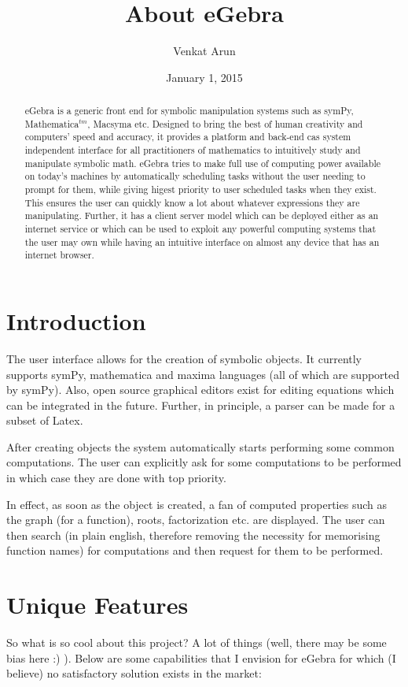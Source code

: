 \documentclass{article}
\title{About eGebra}
\author{Venkat Arun}
\date{January 1, 2015}
\begin{document}
\maketitle

\begin{abstract}
eGebra is a generic front end for symbolic manipulation systems such as symPy, Mathematica$^{tm}$, Macsyma etc. Designed to bring the best of human creativity and computers' speed and accuracy, it provides a platform and back-end cas system independent interface for all practitioners of mathematics to intuitively study and manipulate symbolic math. eGebra tries to make full use of computing power available on today's machines by automatically scheduling tasks without the user needing to prompt for them, while giving higest priority to user scheduled tasks when they exist. This ensures the user can quickly know a lot about whatever expressions they are manipulating. Further, it has a client server model which can be deployed either as an internet service or which can be used to exploit any powerful computing systems that the user may own while having an intuitive interface on almost any device that has an internet browser.
\end{abstract}

\section{Introduction}
The user interface allows for the creation of symbolic objects. It currently supports symPy, mathematica and maxima languages (all of which are supported by symPy). Also, open source graphical editors exist for editing equations which can be integrated in the future. Further, in principle, a parser can be made for a subset of Latex.

After creating objects the system automatically starts performing some common computations. The user can explicitly ask for some computations to be performed in which case they are done with top priority.

In effect, as soon as the object is created, a fan of computed properties such as the graph (for a function), roots, factorization etc. are displayed. The user can then search (in plain english, therefore removing the necessity for memorising function names) for computations and then request for them to be performed.

\section{Unique Features}
So what is so cool about this project? A lot of things (well, there may be some bias here :) ). Below are some capabilities that I envision for eGebra for which (I believe) no satisfactory solution exists in the market:
\end{document}
